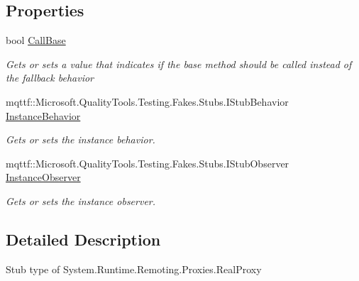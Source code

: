 \subsection*{Properties}
\begin{DoxyCompactItemize}
\item 
bool \hyperlink{class_system_1_1_runtime_1_1_remoting_1_1_proxies_1_1_fakes_1_1_stub_real_proxy_a7cd58d245af1eecab164a51b93e9f8dd}{Call\-Base}
\begin{DoxyCompactList}\small\item\em Gets or sets a value that indicates if the base method should be called instead of the fallback behavior\end{DoxyCompactList}\item 
mqttf\-::\-Microsoft.\-Quality\-Tools.\-Testing.\-Fakes.\-Stubs.\-I\-Stub\-Behavior \hyperlink{class_system_1_1_runtime_1_1_remoting_1_1_proxies_1_1_fakes_1_1_stub_real_proxy_a981195d68d9d961ad27b35b4be1dc9b0}{Instance\-Behavior}
\begin{DoxyCompactList}\small\item\em Gets or sets the instance behavior.\end{DoxyCompactList}\item 
mqttf\-::\-Microsoft.\-Quality\-Tools.\-Testing.\-Fakes.\-Stubs.\-I\-Stub\-Observer \hyperlink{class_system_1_1_runtime_1_1_remoting_1_1_proxies_1_1_fakes_1_1_stub_real_proxy_a68360bd9e8874d1e8a47c1e48522244d}{Instance\-Observer}
\begin{DoxyCompactList}\small\item\em Gets or sets the instance observer.\end{DoxyCompactList}\end{DoxyCompactItemize}


\subsection{Detailed Description}
Stub type of System.\-Runtime.\-Remoting.\-Proxies.\-Real\-Proxy



